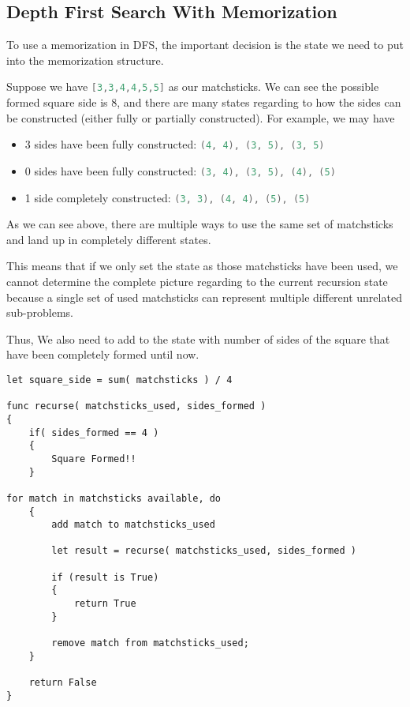\subsection{Depth First Search With Memorization}
To use a memorization in DFS, the important decision is the state we need to put into the memorization structure.

Suppose we have \lstinline[language=C++, basicstyle=\small\ttfamily, keywordstyle=\bfseries\color{green!40!black}]|[3,3,4,4,5,5]| as our matchsticks. We can see the possible formed square side is 8, and there are many states regarding to how the sides can be constructed (either fully or partially constructed). For example, we may have

\begin{itemize}
\item 3 sides have been fully constructed: \lstinline[language=C++, basicstyle=\small\ttfamily, keywordstyle=\bfseries\color{green!40!black}]|(4, 4), (3, 5), (3, 5)|
\item 0 sides have been fully constructed: \lstinline[language=C++, basicstyle=\small\ttfamily, keywordstyle=\bfseries\color{green!40!black}]|(3, 4), (3, 5), (4), (5)|
\item 1 side completely constructed: \lstinline[language=C++, basicstyle=\small\ttfamily, keywordstyle=\bfseries\color{green!40!black}]|(3, 3), (4, 4), (5), (5)| 
\end{itemize}

As we can see above, there are multiple ways to use the same set of matchsticks and land up in completely different states.

This means that if we only set the state as those matchsticks have been used, we cannot determine the complete picture regarding to the current recursion state because a single set of used matchsticks can represent multiple different unrelated sub-problems.

Thus, We also need to add to the state with number of sides of the square that have been completely formed until now.

\begin{lstlisting}[style=customc, caption={}]
let square_side = sum( matchsticks ) / 4

func recurse( matchsticks_used, sides_formed )
{
    if( sides_formed == 4 )
	{
		Square Formed!!
	}

for match in matchsticks available, do
    {
        add match to matchsticks_used

        let result = recurse( matchsticks_used, sides_formed )

        if (result is True) 
        {
            return True
        }
		
        remove match from matchsticks_used;
    }
	
	return False
}
\end{lstlisting}


